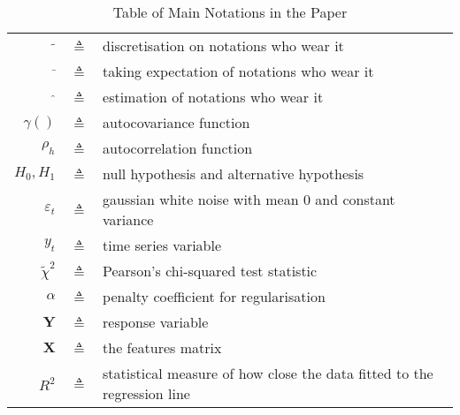 \begin{table}[htbp]\caption{Table of Main Notations in the Paper}
\centering %
\begin{tabular}{r c p{10cm} }
\toprule
$\tilde{}$ & $\triangleq$ & discretisation on notations who wear it\\
$\bar{}$ & $\triangleq$ & taking expectation of notations who wear it\\
$\hat{}$ & $\triangleq$ & estimation of notations who wear it\\
$\gamma()$ & $\triangleq$ & autocovariance function\\
$\rho_h$ & $\triangleq$ & autocorrelation function\\
$H_0,H_1$ & $\triangleq$ & null hypothesis and alternative hypothesis \\
$\varepsilon_t$ & $\triangleq$ &gaussian white noise with mean 0 and constant variance\\
$y_t$ & $\triangleq$ &time series variable\\ 
$\tilde{\chi}^2$ & $\triangleq$ &Pearson's chi-squared test statistic\\ 
$\alpha$ & $\triangleq$ &penalty coefficient for regularisation\\
$\textbf{Y}$ & $\triangleq$ &response variable\\
$\textbf{X}$ & $\triangleq$ &the features matrix\\
$R^2$ & $\triangleq$ &statistical measure of how close the data fitted to the regression line\\
\bottomrule
\end{tabular}
\label{tab:TableOfNotationForMyResearch}
\end{table}